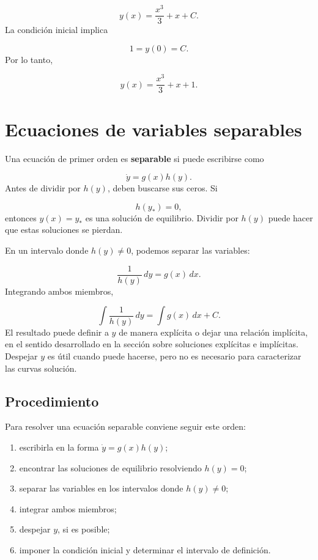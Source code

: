 \documentclass[12pt,a4paper]{article}
\begin{document}
	\[
	y(x)=\frac{x^3}{3}+x+C.
	\]
La condición inicial implica

	\[
	1=y(0)=C.
	\]
Por lo tanto,

	\[
	y(x)=\frac{x^3}{3}+x+1.
	\]

	\clearpage
	\section{Ecuaciones de variables separables}

	Una ecuación de primer orden es \textbf{separable} si puede escribirse como

	\[
	\dot{y}=g(x)h(y).
	\]
Antes de dividir por \(h(y)\), deben buscarse sus ceros. Si

	\[
	h(y_\ast)=0,
	\]
entonces \(y(x)=y_\ast\) es una solución de equilibrio. Dividir por \(h(y)\) puede hacer que estas soluciones se pierdan.

	En un intervalo donde \(h(y)\neq 0\), podemos separar las variables:

	\[
	\frac{1}{h(y)}\,dy=g(x)\,dx.
	\]
Integrando ambos miembros,

	\[
	\int\frac{1}{h(y)}\,dy
	=
	\int g(x)\,dx+C.
	\]
	El resultado puede definir a $y$ de manera explícita o dejar una relación implícita, en el sentido desarrollado en la sección sobre soluciones explícitas e implícitas. Despejar $y$ es útil cuando puede hacerse, pero no es necesario para caracterizar las curvas solución.

	\subsection{Procedimiento}

	Para resolver una ecuación separable conviene seguir este orden:

	\begin{enumerate}[label=\arabic*.]
		\item escribirla en la forma \(\dot{y}=g(x)h(y)\);
		\item encontrar las soluciones de equilibrio resolviendo \(h(y)=0\);
		\item separar las variables en los intervalos donde \(h(y)\neq 0\);
		\item integrar ambos miembros;
		\item despejar \(y\), si es posible;
		\item imponer la condición inicial y determinar el intervalo de definición.
	\end{enumerate}
\end{document}
